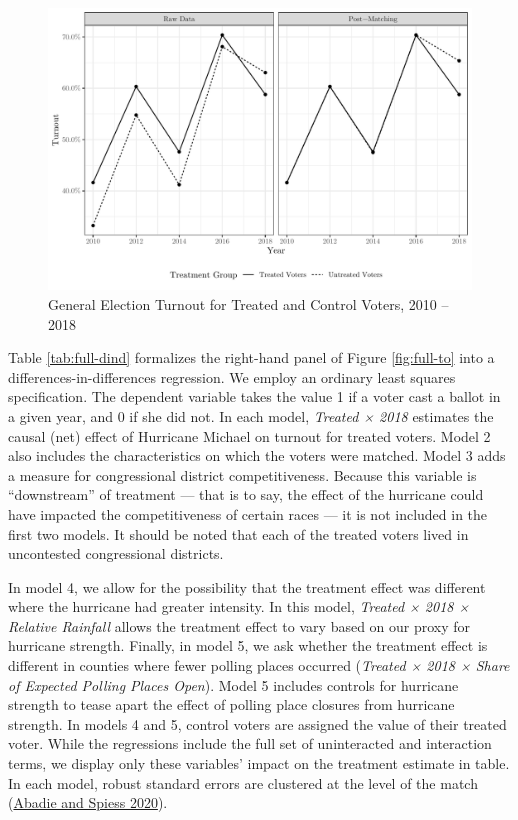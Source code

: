 \documentclass[
  12pt,
]{article}
\begin{document}
\begin{figure}[h]

{\centering \includegraphics{hurricane_michael_files/figure-latex/full-to-chunk-1} 

}

\caption{\label{fig:full-to}General Election Turnout for Treated and Control Voters, 2010 -- 2018}\label{fig:full-to-chunk}
\end{figure}

Table \ref{tab:full-dind} formalizes the right-hand panel of Figure \ref{fig:full-to} into a differences-in-differences regression. We employ an ordinary least squares specification. The dependent variable takes the value 1 if a voter cast a ballot in a given year, and 0 if she did not. In each model, \emph{Treated × 2018} estimates the causal (net) effect of Hurricane Michael on turnout for treated voters. Model 2 also includes the characteristics on which the voters were matched. Model 3 adds a measure for congressional district competitiveness. Because this variable is ``downstream'' of treatment --- that is to say, the effect of the hurricane could have impacted the competitiveness of certain races --- it is not included in the first two models. It should be noted that each of the treated voters lived in uncontested congressional districts.

In model 4, we allow for the possibility that the treatment effect was different where the hurricane had greater intensity. In this model, \emph{Treated × 2018 × Relative Rainfall} allows the treatment effect to vary based on our proxy for hurricane strength. Finally, in model 5, we ask whether the treatment effect is different in counties where fewer polling places occurred (\emph{Treated × 2018 × Share of Expected Polling Places Open}). Model 5 includes controls for hurricane strength to tease apart the effect of polling place closures from hurricane strength. In models 4 and 5, control voters are assigned the value of their treated voter. While the regressions include the full set of uninteracted and interaction terms, we display only these variables' impact on the treatment estimate in table. In each model, robust standard errors are clustered at the level of the match (\protect\hyperlink{ref-Abadie2020}{Abadie and Spiess 2020}).
\end{document}
